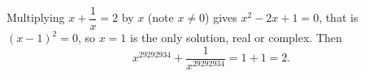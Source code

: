 Multiplying $x+\dfrac{1}{x}=2$ by $x$ (note $x\ne0$) gives $x^2-2x+1=0$, that is $(x-1)^2=0$, so $x=1$ is the only solution, real or complex. Then
\[
x^{29292934}+\dfrac{1}{x^{29292934}}=1+1=\boxed{2}.
\]
